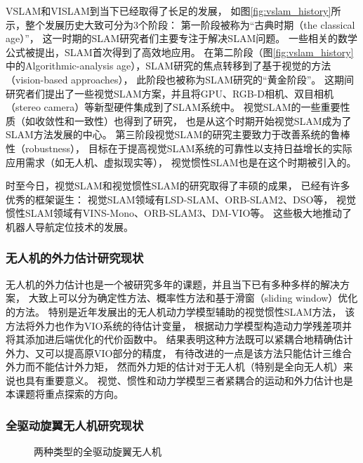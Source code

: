 VSLAM和VISLAM到当下已经取得了长足的发展，
如图\ref{fig:vslam_history}所示，整个发展历史大致可分为3个阶段\cite{servieres2021visual}：
第一阶段被称为“古典时期（the classical age）”，
这一时期的SLAM研究者们主要专注于解决SLAM问题。
一些相关的数学公式被提出，SLAM首次得到了高效地应用。
在第二阶段（图\ref{fig:vslam_history}中的Algorithmic-analysis age），SLAM研究的焦点转移到了基于视觉的方法（vision-based approaches），
此阶段也被称为SLAM研究的“黄金阶段”\cite{servieres2021visual}。
这期间研究者们提出了一些视觉SLAM方案，并且将GPU、RGB-D相机、双目相机（stereo camera）等新型硬件集成到了SLAM系统中。
视觉SLAM的一些重要性质（如收敛性和一致性）也得到了研究，
也是从这个时期开始视觉SLAM成为了SLAM方法发展的中心。
第三阶段视觉SLAM的研究主要致力于改善系统的鲁棒性（robustness），
目标在于提高视觉SLAM系统的可靠性以支持日益增长的实际应用需求（如无人机、虚拟现实等），
视觉惯性SLAM也是在这个时期被引入的。

时至今日，视觉SLAM和视觉惯性SLAM的研究取得了丰硕的成果，
已经有许多优秀的框架诞生：
视觉SLAM领域有LSD-SLAM\cite{engel2014lsd}、ORB-SLAM2\cite{mur2017orb}、DSO\cite{engel2017direct}等，
视觉惯性SLAM领域有VINS-Mono\cite{qin2018vins}、ORB-SLAM3\cite{campos2021orb}、DM-VIO\cite{von2022dm}等。
这些极大地推动了机器人导航定位技术的发展。

\subsubsection{无人机的外力估计研究现状}\label{subsubsec:external_wrench_estimation}
无人机的外力估计也是一个被研究多年的课题，并且当下已有多种多样的解决方案，
大致上可以分为确定性方法、概率性方法和基于滑窗（sliding window）优化的方法\cite{nisar2019vimo}。
特别是近年发展出的无人机动力学模型辅助的视觉惯性SLAM方法\cite{ding2021vid, nisar2019vimo}，
该方法将外力也作为VIO系统的待估计变量，
根据动力学模型构造动力学残差项并将其添加进后端优化的代价函数中。
结果表明这种方法既可以紧耦合地精确估计外力、又可以提高原VIO部分的精度，
有待改进的一点是该方法只能估计三维合外力而不能估计外力矩，
然而外力矩的估计对于无人机（特别是全向无人机）来说也具有重要意义。
视觉、惯性和动力学模型三者紧耦合的运动和外力估计也是本课题将重点探索的方向。

\subsubsection{全驱动旋翼无人机研究现状}

\begin{figure}[!ht]
    \setlength{\subfigcapskip}{-1bp}
    \centering
    \begin{minipage}{\textwidth}

    \centering
    \subfigure{\label{subfig:fix_rotor}}\addtocounter{subfigure}{-2}
    \subfigure{\label{subfig:tilt_rotor}}\addtocounter{subfigure}{-2}

    \end{minipage}
    \caption{两种类型的全驱动旋翼无人机}
    \label{fig:two_types_of_fully_actuated_uav}
\end{figure}

